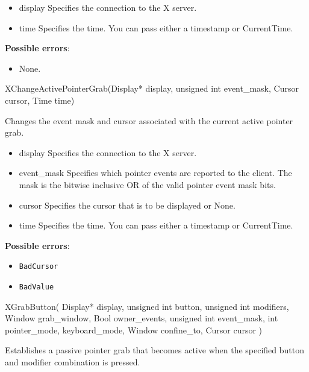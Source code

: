 \documentclass{report}
\begin{document}
\begin{itemize}
        \begin{itemize}
            \item display Specifies the connection to the X server.
            \item time Specifies the time. You can pass either a timestamp or CurrentTime.
        \end{itemize}

        \textbf{Possible errors}:
        \begin{itemize}
            \item None.
        \end{itemize}

        \begin{cppcode}
            XChangeActivePointerGrab(Display* display, unsigned int event_mask, Cursor cursor, Time time)
        \end{cppcode}
        \bigbreak \noindent
        Changes the event mask and cursor associated with the current active pointer grab.

        \begin{itemize}
            \item display Specifies the connection to the X server.
            \item event\_mask Specifies which pointer events are reported to the client. The mask is the bitwise inclusive OR of the valid pointer event mask bits.
            \item cursor Specifies the cursor that is to be displayed or None.
            \item time Specifies the time. You can pass either a timestamp or CurrentTime.
        \end{itemize}

        \textbf{Possible errors}:
        \begin{itemize}
            \item \texttt{BadCursor}
            \item \texttt{BadValue}
        \end{itemize}

        \begin{cppcode}
        XGrabButton(
            Display* display,
            unsigned int button,
            unsigned int modifiers,
            Window grab_window,
            Bool owner_events,
            unsigned int event_mask,
            int pointer_mode, keyboard_mode,
            Window confine_to,
            Cursor cursor
        )
        \end{cppcode}
        \bigbreak \noindent
        Establishes a passive pointer grab that becomes active when the specified button and modifier combination is pressed.


\end{itemize}
\end{document}
